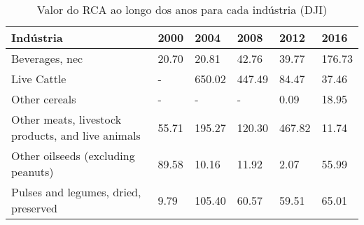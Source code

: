 \begin{table}
\centering
\caption{Valor do RCA ao longo dos anos para cada indústria (DJI)}
\label{tab:ex3-tempo-DJI}
\begin{tabular}{p{6cm}p{1.5cm}p{1.5cm}p{1.5cm}p{1.5cm}p{1.5cm}}
\toprule
                                        Indústria &  2000 &   2004 &   2008 &   2012 &   2016 \\
\midrule
                                   Beverages, nec & 20.70 &  20.81 &  42.76 &  39.77 & 176.73 \\
                                      Live Cattle &     - & 650.02 & 447.49 &  84.47 &  37.46 \\
                                    Other cereals &     - &      - &      - &   0.09 &  18.95 \\
Other meats, livestock products, and live animals & 55.71 & 195.27 & 120.30 & 467.82 &  11.74 \\
               Other oilseeds (excluding peanuts) & 89.58 &  10.16 &  11.92 &   2.07 &  55.99 \\
             Pulses and legumes, dried, preserved &  9.79 & 105.40 &  60.57 &  59.51 &  65.01 \\
\bottomrule
\end{tabular}
\end{table}
